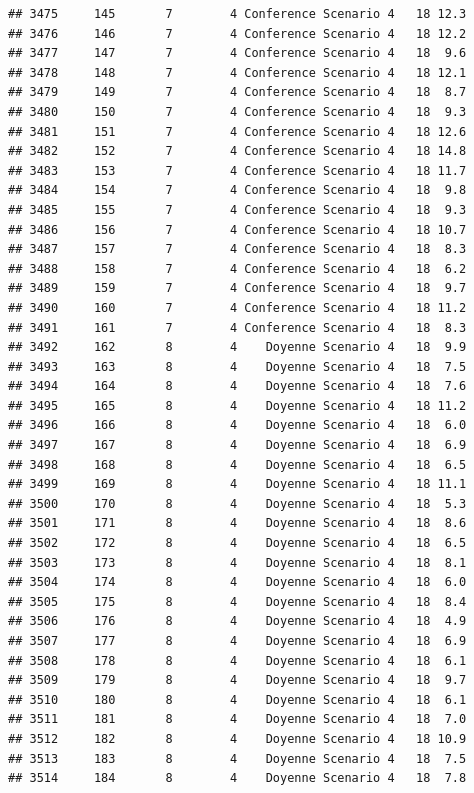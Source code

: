 \documentclass[
]{article}
\begin{document}
\begin{verbatim}
## 3475     145       7        4 Conference Scenario 4   18 12.3
## 3476     146       7        4 Conference Scenario 4   18 12.2
## 3477     147       7        4 Conference Scenario 4   18  9.6
## 3478     148       7        4 Conference Scenario 4   18 12.1
## 3479     149       7        4 Conference Scenario 4   18  8.7
## 3480     150       7        4 Conference Scenario 4   18  9.3
## 3481     151       7        4 Conference Scenario 4   18 12.6
## 3482     152       7        4 Conference Scenario 4   18 14.8
## 3483     153       7        4 Conference Scenario 4   18 11.7
## 3484     154       7        4 Conference Scenario 4   18  9.8
## 3485     155       7        4 Conference Scenario 4   18  9.3
## 3486     156       7        4 Conference Scenario 4   18 10.7
## 3487     157       7        4 Conference Scenario 4   18  8.3
## 3488     158       7        4 Conference Scenario 4   18  6.2
## 3489     159       7        4 Conference Scenario 4   18  9.7
## 3490     160       7        4 Conference Scenario 4   18 11.2
## 3491     161       7        4 Conference Scenario 4   18  8.3
## 3492     162       8        4    Doyenne Scenario 4   18  9.9
## 3493     163       8        4    Doyenne Scenario 4   18  7.5
## 3494     164       8        4    Doyenne Scenario 4   18  7.6
## 3495     165       8        4    Doyenne Scenario 4   18 11.2
## 3496     166       8        4    Doyenne Scenario 4   18  6.0
## 3497     167       8        4    Doyenne Scenario 4   18  6.9
## 3498     168       8        4    Doyenne Scenario 4   18  6.5
## 3499     169       8        4    Doyenne Scenario 4   18 11.1
## 3500     170       8        4    Doyenne Scenario 4   18  5.3
## 3501     171       8        4    Doyenne Scenario 4   18  8.6
## 3502     172       8        4    Doyenne Scenario 4   18  6.5
## 3503     173       8        4    Doyenne Scenario 4   18  8.1
## 3504     174       8        4    Doyenne Scenario 4   18  6.0
## 3505     175       8        4    Doyenne Scenario 4   18  8.4
## 3506     176       8        4    Doyenne Scenario 4   18  4.9
## 3507     177       8        4    Doyenne Scenario 4   18  6.9
## 3508     178       8        4    Doyenne Scenario 4   18  6.1
## 3509     179       8        4    Doyenne Scenario 4   18  9.7
## 3510     180       8        4    Doyenne Scenario 4   18  6.1
## 3511     181       8        4    Doyenne Scenario 4   18  7.0
## 3512     182       8        4    Doyenne Scenario 4   18 10.9
## 3513     183       8        4    Doyenne Scenario 4   18  7.5
## 3514     184       8        4    Doyenne Scenario 4   18  7.8

\end{verbatim}
\end{document}
